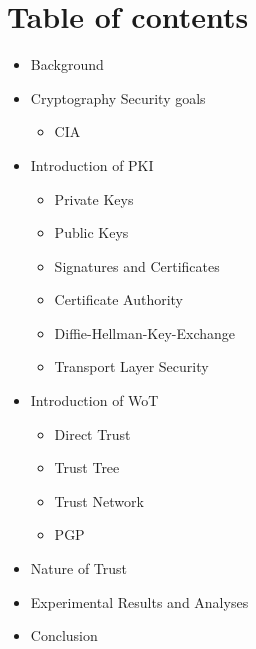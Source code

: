 \section{Table of contents}
\begin{frame}
    \begin{itemize}
        \item<1> Background
        \item<1> Cryptography Security goals
            \begin{itemize}
                \item<1> CIA
            \end{itemize}
        \item<1> Introduction of PKI
            \begin{itemize}
                \item<1> Private Keys
                \item<1> Public Keys
                \item<1> Signatures and Certificates
                \item<1> Certificate Authority
                \item<1> Diffie-Hellman-Key-Exchange
                \item<1> Transport Layer Security
            \end{itemize}
        \item<1> Introduction of WoT
            \begin{itemize}
                \item<1> Direct Trust
                \item<1> Trust Tree
                \item<1> Trust Network
                \item<1> PGP
            \end{itemize}
        \item<1> Nature of Trust
        \item<1> Experimental Results and Analyses
        \item<1> Conclusion
    \end{itemize}
\end{frame}

